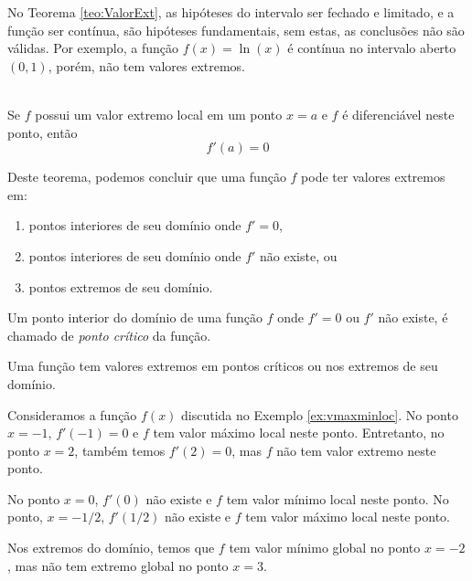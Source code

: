 \cleardoublepage\documentclass[../main.tex]{subfiles}
\begin{document}
No Teorema \ref{teo:ValorExt}, as hipóteses do intervalo ser fechado e limitado, e a função ser contínua, são hipóteses fundamentais, sem estas, as conclusões não são válidas. Por exemplo, a função \(f(x)=\ln(x)\) é contínua no intervalo aberto \((0,1)\), porém, não tem valores extremos.

  
\begin{framed}
\begin{teo}~
\\  Se $f$ possui um valor extremo local em um ponto $x=a$ e $f$ é diferenciável neste ponto, então
  \begin{equation*}
    f'(a) = 0
  \end{equation*}
\end{teo}\end{framed}

Deste teorema, podemos concluir que uma função $f$ pode ter valores extremos em:
\begin{enumerate}
\item pontos interiores de seu domínio onde $f' = 0$,
\item pontos interiores de seu domínio onde $f'$ não existe, ou
\item pontos extremos de seu domínio.
\end{enumerate}

Um ponto interior do domínio de uma função $f$ onde $f'=0$ ou $f'$ não existe, é chamado de \emph{ponto crítico} da função.

\begin{obs}\label{obs:pt_critico_val_extremo}
  Uma função tem valores extremos em pontos críticos ou nos extremos de seu domínio.
\end{obs}


\begin{ex}
  Consideramos a função $f(x)$ discutida no Exemplo \ref{ex:vmaxminloc}. No ponto $x=-1$, $f'(-1)=0$ e $f$ tem valor máximo local neste ponto. Entretanto, no ponto $x=2$, também temos $f'(2)=0$, mas $f$ não tem valor extremo neste ponto.

  No ponto $x=0$, $f'(0)$ não existe e $f$ tem valor mínimo local neste ponto. No ponto, $x=-1/2$, $f'(1/2)$ não existe e $f$ tem valor máximo local neste ponto.

  Nos extremos do domínio, temos que $f$ tem valor mínimo global no ponto $x=-2$, mas não tem extremo global no ponto $x=3$.
\end{ex}
\end{document}
